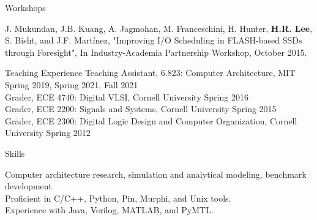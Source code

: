 \documentclass{resume} %
\begin{document}
\begin{rSection}{Workshops}

J. Mukundan, J.B. Kuang, A. Jagmohan, M. Franceschini, H. Hunter, {\bf H.R. Lee}, S. Bisht, and J.F. Martínez, "Improving I/O Scheduling in FLASH-based SSDs through Foresight", In Industry-Academia Partnership Workshop, October 2015.

\end{rSection}


\begin{rSection}{Teaching Experience}
Teaching Assistant, 6.823: Computer Architecture, MIT \hfill {Spring 2019, Spring 2021, Fall 2021} \\
Grader, ECE 4740: Digital VLSI, Cornell University \hfill {Spring 2016} \\
Grader, ECE 2200: Signals and Systems, Cornell University \hfill {Spring 2015} \\
Grader, ECE 2300: Digital Logic Design and Computer Organization, Cornell University \hfill{Spring 2012}

\end{rSection}


\begin{rSection}{Skills}

Computer architecture research, simulation and analytical modeling, benchmark development \\
Proficient in C/C++, Python, Pin, Murphi, and Unix tools. \\
Experience with Java, Verilog, MATLAB, and PyMTL.

\end{rSection}






\end{document}
